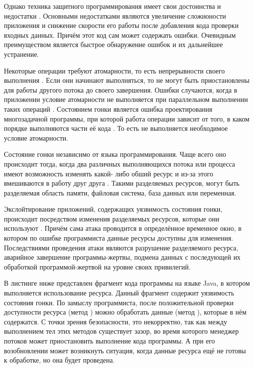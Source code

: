 %
Однако техника защитного программирования имеет свои достоинства и недостатки 
. 
%
Основными недостатками являются увеличение сложноности приложения и снижение скорости его работы 
после добавления кода проверки входных данных. 
%
Причём этот код сам может содержать ошибки. 
%
Очевидным преимуществом является быстрое обнаружение ошибок и их дальнейшее устранение.



%
Некоторые операции требуют атомарности, то есть непрерывности своего выполнения 
. 
%
Если они начинают выполняться, то не могут быть приостановлены для работы другого потока до своего 
завершения. 
%
Ошибки случаются, когда в приложении условие атомарности не выполняется при параллельном выполнении 
таких операций . 
%
Состоянием гонки является ошибка проектирования многозадачной программы, при которой работа 
операции зависит от того, в каком порядке выполняются части её кода . 
%
То есть не выполняется необходимое условие атомарности.

%
Состояние гонки независимо от языка программирования. 
%
Чаще всего оно происходит тогда, когда два различных выполняющихся потока или процесса имеют 
возможность изменять какой- либо обший ресурс и из-за этого вмешиваются в работу друг друга 
. 
%
Такими разделяемых ресурсов, могут  быть разделяемая область памяти, файловая система, база данных 
или переменная. 

%
Экслойтирование приложений, содержащих уязвимость состояния гонки, происходит посредством изменения 
разделяемых ресурсов, которые они используют . 
%
Причём сама атака проводится в определённое временное окно, в котором по ошибке программиста данные 
ресурсы доступны для изменения. 
%
Последствиями проведения атаки являются разрушение разделяемого ресурса, аварийное завершение 
программы-жертвы, подмена данных с последующей их обработкой программой-жертвой на уровне своих 
привилегий. 

%
В листинге ниже представлен фрагмент кода программы на языке Java, в котором выполняется 
использование ресурса. 
%
Данный фрагмент содержит уязвимость состояния гонки. 
%
По замыслу программиста, после положительной проверки доступности ресурса (метод 
) можно обработать данные (метод 
), которые в нём содержатся. 
% 
С точки зрения безопасности, это некорректно, так как между выполнением тел этих методов существует 
зазор, во время которого менеджер потоков может приостановить выполнение кода программы. 
%
А при его возобновлении может возникнуть ситуация, когда данные ресурса ещё не готовы к обработке, 
но она будет проведена. 

